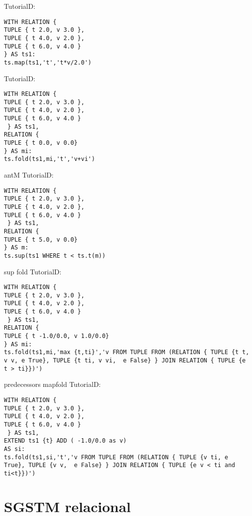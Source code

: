 TutorialD:
\begin{verbatim}
WITH RELATION {
TUPLE { t 2.0, v 3.0 },
TUPLE { t 4.0, v 2.0 },
TUPLE { t 6.0, v 4.0 }
} AS ts1: 
ts.map(ts1,'t','t*v/2.0')
\end{verbatim}

TutorialD:
\begin{verbatim}
WITH RELATION {
TUPLE { t 2.0, v 3.0 },
TUPLE { t 4.0, v 2.0 },
TUPLE { t 6.0, v 4.0 }
 } AS ts1,
RELATION {
TUPLE { t 0.0, v 0.0}
} AS mi: 
ts.fold(ts1,mi,'t','v+vi')
\end{verbatim}

antM TutorialD:
\begin{verbatim}
WITH RELATION {
TUPLE { t 2.0, v 3.0 },
TUPLE { t 4.0, v 2.0 },
TUPLE { t 6.0, v 4.0 }
 } AS ts1,
RELATION {
TUPLE { t 5.0, v 0.0}
} AS m: 
ts.sup(ts1 WHERE t < ts.t(m))
\end{verbatim}

sup fold TutorialD:
\begin{verbatim}
WITH RELATION {
TUPLE { t 2.0, v 3.0 },
TUPLE { t 4.0, v 2.0 },
TUPLE { t 6.0, v 4.0 }
 } AS ts1,
RELATION {
TUPLE { t -1.0/0.0, v 1.0/0.0}
} AS mi: 
ts.fold(ts1,mi,'max {t,ti}','v FROM TUPLE FROM (RELATION { TUPLE {t t, v v, e True}, TUPLE {t ti, v vi,  e False} } JOIN RELATION { TUPLE {e t > ti}})')
\end{verbatim}

predecessors mapfold TutorialD:
\begin{verbatim}
WITH RELATION {
TUPLE { t 2.0, v 3.0 },
TUPLE { t 4.0, v 2.0 },
TUPLE { t 6.0, v 4.0 }
 } AS ts1,
EXTEND ts1 {t} ADD ( -1.0/0.0 as v)
AS si: 
ts.fold(ts1,si,'t','v FROM TUPLE FROM (RELATION { TUPLE {v ti, e True}, TUPLE {v v,  e False} } JOIN RELATION { TUPLE {e v < ti and ti<t}})')
\end{verbatim}


\section{SGSTM relacional}














